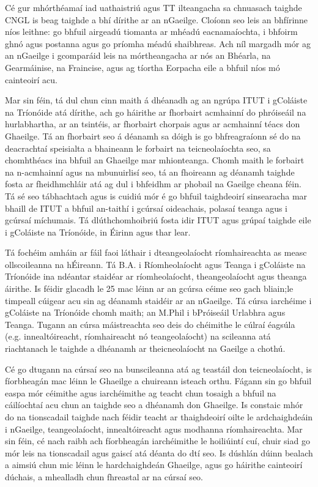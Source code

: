 \begin{multicols}{2}
Cé gur mhórthéamaí iad uathaistriú agus TT ilteangacha sa chnuasach taighde CNGL is beag taighde a bhí dírithe ar an nGaeilge. Cloíonn seo leis an bhfírinne níos leithne: go bhfuil airgeadú tiomanta ar mhéadú eacnamaíochta, i bhfoirm ghnó agus postanna agus go príomha méadú shaibhreas. Ach níl margadh mór ag an nGaeilge i gcomparáid leis na mórtheangacha ar nós an Bhéarla, na Gearmáinise, na Fraincise, agus ag tíortha Eorpacha eile a bhfuil níos mó cainteoirí acu. 


Mar sin féin, tá dul chun cinn maith á dhéanadh ag an ngrúpa ITUT i gColáiste na Tríonóide atá dírithe, ach go háirithe ar fhorbairt acmhainní do phróiseáil na hurlabhartha, ar an tsintéis, ar fhorbairt chorpais agus ar acmhainní téacs don Ghaeilge. Tá an fhorbairt seo á déanamh sa dóigh is go bhfreagraíonn sé do na deacrachtaí speisialta a bhaineann le forbairt na teicneolaíochta seo, sa chomhthéacs ina bhfuil an Ghaeilge mar mhionteanga. Chomh maith le forbairt na n-acmhainní agus na mbunuirlisí seo, tá an fhoireann ag déanamh taighde fosta ar fheidhmchláir atá ag dul i bhfeidhm ar phobail na Gaeilge cheana féin. Tá sé seo tábhachtach agus is cuidiú mór é go bhfuil taighdeoirí sinsearacha mar bhaill de ITUT a bhfuil an-taithí i gcúrsaí oideachais, polasaí teanga agus i gcúrsaí míchumais. Tá dlúthchomhoibriú fosta idir ITUT agus grúpaí taighde eile i gColáiste na Tríonóide, in Éirinn agus thar lear.

Tá fochéim amháin ar fáil faoi láthair i dteangeolaíocht ríomhaireachta as measc ollscoileanna na hÉireann. Tá B.A. i Ríomheolaíocht  agus  Teanga i  gColáiste na Tríonóide ina ndéantar staidéar ar ríomheolaíocht, theangeolaíocht agus theanga áirithe. Is féidir glacadh le 25 mac léinn ar an gcúrsa céime seo gach bliain;le timpeall cúigear acu sin ag déanamh staidéir ar an nGaeilge. Tá cúrsa iarchéime i gColáiste na Tríonóide chomh maith; an M.Phil i bPróiseáil Urlabhra agus Teanga. Tugann an cúrsa máistreachta seo deis do chéimithe le cúlraí éagsúla (e.g. innealtóireacht, ríomhaireacht nó teangeolaíocht) na scileanna atá riachtanach le taighde a dhéanamh ar theicneolaíocht na Gaeilge a chothú.


Cé go dtugann na cúrsaí seo na bunscileanna atá ag teastáil don teicneolaíocht, is fíorbheagán mac léinn le Ghaeilge a chuireann isteach orthu. Fágann sin go bhfuil easpa mór céimithe agus iarchéimithe  ag teacht chun tosaigh a bhfuil na cáilíochtaí acu chun an taighde seo a dhéanamh don Ghaeilge. Is constaic mhór do na tionscadail taighde nach féidir teacht ar thaighdeoirí oilte le ardchaighdeáin i nGaeilge, teangeolaíocht, innealtóireacht agus modhanna ríomhaireachta. Mar sin féin, cé nach raibh ach fíorbheagán iarchéimithe le hoiliúintí cuí, chuir siad go mór leis na tionscadail agus gaiscí atá déanta do dtí seo. Is dúshlán dúinn bealach a aimsiú chun mic léinn le hardchaighdeán Ghaeilge, agus go háirithe cainteoirí dúchais, a mhealladh chun fhreastal ar na cúrsaí seo.


\end{multicols}
